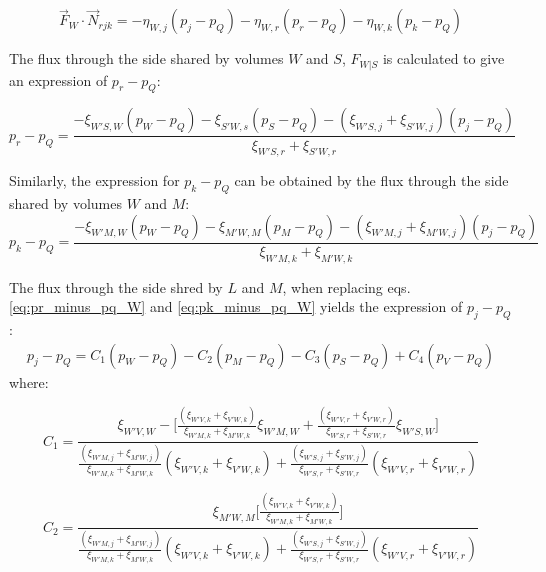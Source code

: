 \documentclass{article}
\begin{document}
\begin{equation} \label{eq:flux_volume_W_with_eta}
\vec{F}_{W} \cdot \vec{N}_{rjk} = - \eta_{W,j}(p_{j} - p_{Q}) - \eta_{W,r}(p_{r} - p_{Q}) - \eta_{W,k}(p_{k} - p_{Q})
\end{equation}

The flux through the side shared by volumes $ W $ and $ S $, $ F_{W|S} $ is calculated to give an expression of $ p_{r} - p_{Q} $:

\begin{equation}  \label{eq:pr_minus_pq_W}
p_{r} - p_{Q} = \frac{-\xi_{W'S,W}(p_{W}-p_{Q})-\xi_{S'W,s}(p_{S}-p_{Q}) -(\xi_{W'S,j}+\xi_{S'W,j})(p_{j}-p_{Q})}{\xi_{W'S,r}+\xi_{S'W,r}}
\end{equation}

Similarly, the expression for $ p_{k} - p_{Q} $ can be obtained by the flux through the side shared by volumes $ W $ and $ M $:
\begin{equation}  \label{eq:pk_minus_pq_W}
p_{k} - p_{Q} = \frac{-\xi_{W'M,W}(p_{W}-p_{Q})-\xi_{M'W,M}(p_{M}-p_{Q}) -(\xi_{W'M,j}+\xi_{M'W,j})(p_{j}-p_{Q})}{\xi_{W'M,k}+\xi_{M'W,k}}
\end{equation}

The flux through the side shred by $ L $ and $ M $, when replacing eqs. \ref{eq:pr_minus_pq_W} and \ref{eq:pk_minus_pq_W} yields the expression of $ p_{j} - p_{Q} $:
\begin{equation} \label{eq:pj_minus_pq_W}
\begin{split}
p_{j}-p_{Q} = C_{1}(p_{W}-p_{Q}) - C_{2}(p_{M} - p_{Q}) - C_{3}(p_{S}-p_{Q})+C_{4}(p_{V}-p_{Q})
\end{split}
\end{equation}
where:

\begin{displaymath}
C_{1} = \frac{\xi_{W'V,W}-\Bigg[\frac{(\xi_{W'V,k}+\xi_{V'W,k})}{\xi_{W'M,k}+\xi_{M'W,k}}\xi_{W'M,W}+\frac{(\xi_{W'V,r}+\xi_{V'W,r})}{\xi_{W'S,r}+\xi_{S'W,r}}\xi_{W'S,W}\Bigg]}{\frac{(\xi_{W'M,j}+\xi_{M'W,j})}{\xi_{W'M,k}+\xi_{M'W,k}}(\xi_{W'V,k}+\xi_{V'W,k})+\frac{(\xi_{W'S,j}+\xi_{S'W,j})}{\xi_{W'S,r}+\xi_{S'W,r}}(\xi_{W'V,r}+\xi_{V'W,r})}
\end{displaymath}

\begin{displaymath}
C_{2} =  \frac{\xi_{M'W,M}\Bigg[\frac{(\xi_{W'V,k}+\xi_{V'W,k})}{\xi_{W'M,k}+\xi_{M'W,k}}\Bigg]}{\frac{(\xi_{W'M,j}+\xi_{M'W,j})}{\xi_{W'M,k}+\xi_{M'W,k}}(\xi_{W'V,k}+\xi_{V'W,k})+\frac{(\xi_{W'S,j}+\xi_{S'W,j})}{\xi_{W'S,r}+\xi_{S'W,r}}(\xi_{W'V,r}+\xi_{V'W,r})}
\end{displaymath}
\end{document}
